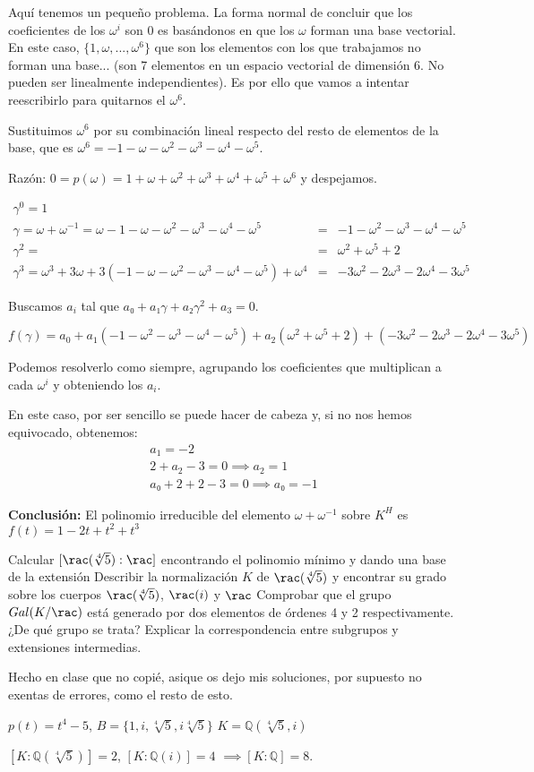 \begin{problem}[1]
Aquí tenemos un pequeño problema. La forma normal de concluir que los coeficientes de los $\omega^i$ son 0 es basándonos en que los $ω$ forman una base vectorial. En este caso, $\{1,ω,...,ω^6\}$ que son los elementos con los que trabajamos no forman una base... (son 7 elementos en un espacio vectorial de dimensión 6. No pueden ser linealmente independientes). Es por ello que vamos a intentar reescribirlo para quitarnos el $ω^6$.

Sustituimos $ω^6$ por su combinación lineal respecto del resto de elementos de la base, que es $ω^6 = -1-ω-ω^2-ω^3-ω^4-ω^5$.

Razón: $0 = p(ω) = 1+ω+ω^2 + ω^3 + ω^4+ω^5+ω^6$ y despejamos.


\[\begin{array}{lcc}
γ^0 = 1&\\
γ = ω+ω^{-1} = ω -1-ω-ω^2-ω^3-ω^4-ω^5 &=& -1 -ω^2-ω^3-ω^4-ω^5 \\
γ^2 = &=& ω^2 + ω^5 + 2\\
γ^3 = ω^3 + 3ω + 3(-1-ω-ω^2-ω^3-ω^4-ω^5) + ω^4 &=& -3ω^2 -2ω^3 -2ω^4-3ω^5
\end{array}\]

Buscamos $a_i$ tal que $a₀ + a₁γ + a₂γ^2 + a_3 = 0$.

$$f(γ) = a_0 + a_1 (-1 -ω^2-ω^3-ω^4-ω^5) + a_2 ( ω^2 + ω^5 + 2) + (-3ω^2 -2ω^3 -2ω^4-3ω^5)$$

Podemos resolverlo como siempre, agrupando los coeficientes que multiplican a cada $ω^i$ y obteniendo los $a_i$.

En este caso, por ser sencillo se puede hacer de cabeza y, si no nos hemos equivocado, obtenemos:
\[\begin{array}{l}
a_1 = -2\\2+a_2 -3 = 0 \implies a_2 = 1\\a₀ + 2 + 2 -3 = 0 \implies a₀=-1
\end{array}\]


\textbf{Conclusión: } El polinomio irreducible del elemento $ω+ω^{-1}$ sobre $K^H$ es $f(t) = 1-2t+t^2+t^3$
\end{problem}

\begin{problem}[2]
\ppart Calcular $[\rac(\sqrt[4]{5}):\rac]$ encontrando el polinomio mínimo y dando una base de la extensión
\ppart Describir la normalización $K$ de $\rac(\sqrt[4]{5})$ y encontrar su grado sobre los cuerpos $\rac(\sqrt[4]{5})$, $\rac(i)$ y $\rac$
\ppart Comprobar que el grupo $Gal(K/\rac)$ está generado por dos elementos de órdenes 4 y 2 respectivamente. ¿De qué grupo se trata?
\ppart Explicar la correspondencia entre subgrupos y extensiones intermedias.

\solution

Hecho en clase que no copié, asique os dejo mis soluciones, por supuesto no exentas de errores, como el resto de esto.

\spart $p(t) = t^4 - 5$, $B = \{1,i,\sqrt[4]{5},i\sqrt[4]{5}\}$
\spart $K = ℚ(\sqrt[4]{5},i)$

$[K:ℚ(\sqrt[4]{5})] = 2$, $[K:ℚ(i)] = 4$ $\implies [K:ℚ] = 8$.

\end{problem}

